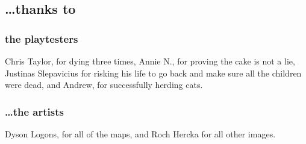 \vspace{3cm}

\begin{multicols}{2}

\subsection*{\ldots thanks to}
\subsubsection*{the playtesters}
Chris Taylor, for dying three times,
Annie N., for proving the cake is not a lie,
Justinas Slepavicius for risking his life to go back and make sure all the children were dead,
and Andrew, for successfully herding cats.

\columnbreak

\subsubsection*{\ldots the artists}

Dyson Logons, for all of the maps,
and Roch Hercka for all other images.

\end{multicols}
